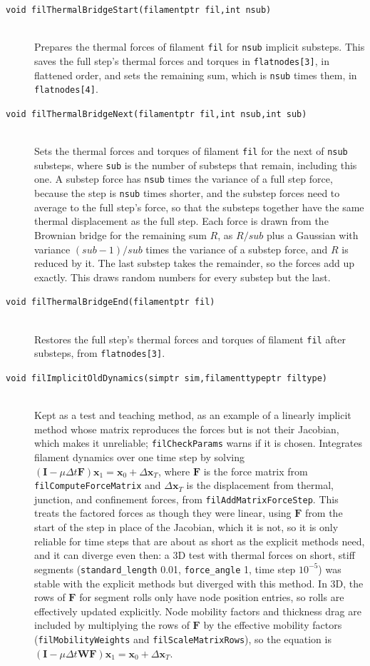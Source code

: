 \documentclass {scrbook}
\newcommand {\ttt} {\texttt}
\begin{document}
\begin{description}
\item[\ttt{void filThermalBridgeStart(filamentptr fil,int nsub)}]
\hfill \\
Prepares the thermal forces of filament \ttt{fil} for \ttt{nsub} implicit substeps. This saves the full step's thermal forces and torques in \ttt{flatnodes[3]}, in flattened order, and sets the remaining sum, which is \ttt{nsub} times them, in \ttt{flatnodes[4]}.

\item[\ttt{void filThermalBridgeNext(filamentptr fil,int nsub,int sub)}]
\hfill \\
Sets the thermal forces and torques of filament \ttt{fil} for the next of \ttt{nsub} substeps, where \ttt{sub} is the number of substeps that remain, including this one. A substep force has \ttt{nsub} times the variance of a full step force, because the step is \ttt{nsub} times shorter, and the substep forces need to average to the full step's force, so that the substeps together have the same thermal displacement as the full step. Each force is drawn from the Brownian bridge for the remaining sum $R$, as $R/sub$ plus a Gaussian with variance $(sub-1)/sub$ times the variance of a substep force, and $R$ is reduced by it. The last substep takes the remainder, so the forces add up exactly. This draws random numbers for every substep but the last.

\item[\ttt{void filThermalBridgeEnd(filamentptr fil)}]
\hfill \\
Restores the full step's thermal forces and torques of filament \ttt{fil} after substeps, from \ttt{flatnodes[3]}.

\item[\ttt{void filImplicitOldDynamics(simptr sim,filamenttypeptr filtype)}]
\hfill \\
Kept as a test and teaching method, as an example of a linearly implicit method whose matrix reproduces the forces but is not their Jacobian, which makes it unreliable; \ttt{filCheckParams} warns if it is chosen. Integrates filament dynamics over one time step by solving $(\bm{I}-\mu\Delta t\bm{F})\bm{x}_1=\bm{x}_0+\Delta\bm{x}_T$, where $\bm{F}$ is the force matrix from \ttt{filComputeForceMatrix} and $\Delta\bm{x}_T$ is the displacement from thermal, junction, and confinement forces, from \ttt{filAddMatrixForceStep}. This treats the factored forces as though they were linear, using $\bm{F}$ from the start of the step in place of the Jacobian, which it is not, so it is only reliable for time steps that are about as short as the explicit methods need, and it can diverge even then: a 3D test with thermal forces on short, stiff segments (\ttt{standard\_length} 0.01, \ttt{force\_angle} 1, time step $10^{-5}$) was stable with the explicit methods but diverged with this method. In 3D, the rows of $\bm{F}$ for segment rolls only have node position entries, so rolls are effectively updated explicitly. Node mobility factors and thickness drag are included by multiplying the rows of $\bm{F}$ by the effective mobility factors (\ttt{filMobilityWeights} and \ttt{filScaleMatrixRows}), so the equation is $(\bm{I}-\mu\Delta t\bm{W}\bm{F})\bm{x}_1=\bm{x}_0+\Delta\bm{x}_T$.


\end{description}
\end{document}
